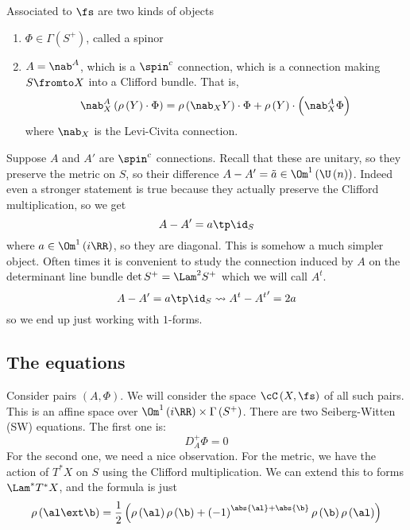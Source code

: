 \documentclass{amsart}
\begin{document}
Associated to $\fs$ are two kinds of objects
\begin{enumerate}
\item $\Phi \in \Gamma\left( S^+ \right)$, called a spinor
\item $A = \nab^A$, which is a $\spin^c$ connection, which is a connection making $S\fromto X$
into a Clifford bundle.
That is, 
\begin{equation}
\nab_X^A\left( \rho\left( Y \right) \cdot \Phi \right) = 
\rho\left( \nab_X Y \right) \cdot \Phi + \rho\left( Y \right) \cdot
\left( \nab_X^A \Phi \right)
\end{equation}
where $\nab_X$ is the Levi-Civita connection. 
\end{enumerate}

Suppose $A$ and $A'$ are $\spin^c$ connections.
Recall that these are unitary, so they preserve the metric on $S$,
so their difference $A - A' = \tilde a\in \Om^1\left( \U\left( n \right) \right)$.
Indeed even a stronger statement is true because they actually preserve the Clifford multiplication,
so we get
\begin{equation}
A - A' = a\tp \id_S
\end{equation}
where $a\in \Om^1\left( i \RR \right)$, so they are diagonal.
This is somehow a much simpler object.
Often times it is convenient to study the connection induced by $A$ on the determinant line bundle
$\det S^+ = \Lam^2 S^+$ which we will call $A^t$.
\begin{equation}
A - A' = a\tp \id_S 
\leadsto
A^t - {A^{t}}' = 2a
\end{equation}
so we end up just working with $1$-forms.

\subsection{The equations}
Consider pairs $\left( A , \Phi \right)$.
We will consider the space $\cC\left( X , \fs \right)$ of all such pairs. 
This is an affine space over $\Om^1\left( i\RR \right) \times \Gamma\left( S^+ \right)$. 
There are two Seiberg-Witten (SW) equations. The first one is:
\begin{equation}
\boxed{D_A^+ \Phi = 0}
\end{equation}
For the second one, we need a nice observation.
For the metric, we have the action of $T^*X$ on $S$ using the Clifford multiplication. 
We can extend this to forms $\Lam^* T^* X$, and the formula is just
\begin{equation}
\rho\left( \al \ext \b \right) = \frac{1}{2}
\left( \rho\left( \al \right) \rho\left( \b \right) + 
\left( -1 \right)^{\abs{\al} + \abs{\b}}\rho\left( \b \right) \rho\left( \al \right)\right)
\end{equation}
\end{document}
